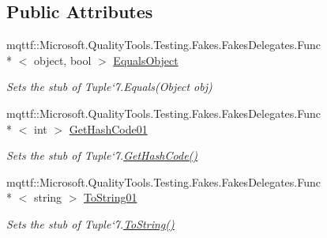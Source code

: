 \subsection*{Public Attributes}
\begin{DoxyCompactItemize}
\item 
mqttf\-::\-Microsoft.\-Quality\-Tools.\-Testing.\-Fakes.\-Fakes\-Delegates.\-Func\\*
$<$ object, bool $>$ \hyperlink{class_system_1_1_fakes_1_1_stub_tuple_3_01_t1_00_01_t2_00_01_t3_00_01_t4_00_01_t5_00_01_t6_00_01_t7_01_4_a64109d1cde3c75824b2dfe8d7bcace42}{Equals\-Object}
\begin{DoxyCompactList}\small\item\em Sets the stub of Tuple`7.Equals(\-Object obj)\end{DoxyCompactList}\item 
mqttf\-::\-Microsoft.\-Quality\-Tools.\-Testing.\-Fakes.\-Fakes\-Delegates.\-Func\\*
$<$ int $>$ \hyperlink{class_system_1_1_fakes_1_1_stub_tuple_3_01_t1_00_01_t2_00_01_t3_00_01_t4_00_01_t5_00_01_t6_00_01_t7_01_4_a65fb7dfc36b7ea9c59850830233172a6}{Get\-Hash\-Code01}
\begin{DoxyCompactList}\small\item\em Sets the stub of Tuple`7.\hyperlink{class_system_1_1_fakes_1_1_stub_tuple_3_01_t1_00_01_t2_00_01_t3_00_01_t4_00_01_t5_00_01_t6_00_01_t7_01_4_ac862abf0f649471d158b3beb00cfe7d1}{Get\-Hash\-Code()}\end{DoxyCompactList}\item 
mqttf\-::\-Microsoft.\-Quality\-Tools.\-Testing.\-Fakes.\-Fakes\-Delegates.\-Func\\*
$<$ string $>$ \hyperlink{class_system_1_1_fakes_1_1_stub_tuple_3_01_t1_00_01_t2_00_01_t3_00_01_t4_00_01_t5_00_01_t6_00_01_t7_01_4_a410311832576d61552f897320f36f645}{To\-String01}
\begin{DoxyCompactList}\small\item\em Sets the stub of Tuple`7.\hyperlink{class_system_1_1_fakes_1_1_stub_tuple_3_01_t1_00_01_t2_00_01_t3_00_01_t4_00_01_t5_00_01_t6_00_01_t7_01_4_a249de5c8b927c986e45eec7cefb7c9e3}{To\-String()}\end{DoxyCompactList}\end{DoxyCompactItemize}
